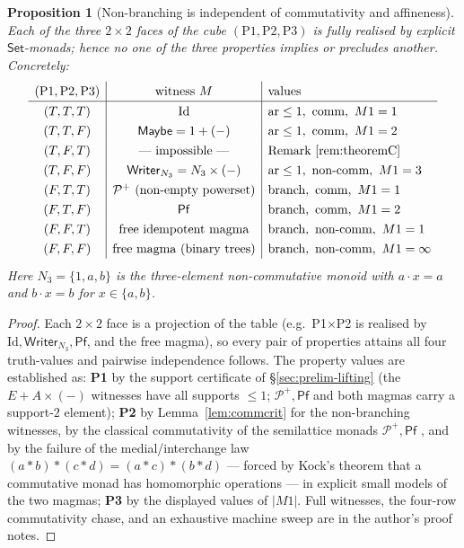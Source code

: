 \documentclass[11pt]{amsart}
\theoremstyle{plain}
\newtheorem{proposition}[theorem]{Proposition}
\theoremstyle{definition}
\theoremstyle{remark}
\newcommand{\Set}{\mathsf{Set}}
\newcommand{\Maybe}{\mathsf{Maybe}}
\newcommand{\Pf}{\mathsf{Pf}}
\newcommand{\Writer}{\mathsf{Writer}}
\begin{document}
\begin{proposition}[Non-branching is independent of commutativity and affineness]\label{prop:independence}
Each of the three $2\times2$ faces of the cube $(\mathrm{P1},\mathrm{P2},\mathrm{P3})$ is fully
realised by explicit $\Set$-monads; hence no one of the three properties implies or precludes
another. Concretely:
\[
  \renewcommand{\arraystretch}{1.3}
  \begin{array}{c|c|l}
    (\mathrm{P1},\mathrm{P2},\mathrm{P3}) & \text{witness } M & \text{values}\\\hline
    (T,T,T) & \mathrm{Id} & \text{ar}\le1,\ \text{comm},\ M1=1\\
    (T,T,F) & \Maybe=1+(-) & \text{ar}\le1,\ \text{comm},\ M1=2\\
    (T,F,T) & \text{--- impossible ---} & \text{Remark~\ref{rem:theoremC}}\\
    (T,F,F) & \Writer_{N_3}=N_3\times(-) & \text{ar}\le1,\ \text{non-comm},\ M1=3\\
    (F,T,T) & \mathcal P^{+}\ (\text{non-empty powerset}) & \text{branch},\ \text{comm},\ M1=1\\
    (F,T,F) & \Pf & \text{branch},\ \text{comm},\ M1=2\\
    (F,F,T) & \text{free idempotent magma} & \text{branch},\ \text{non-comm},\ M1=1\\
    (F,F,F) & \text{free magma (binary trees)} & \text{branch},\ \text{non-comm},\ M1=\infty
  \end{array}
\]
Here $N_3=\{1,a,b\}$ is the three-element non-commutative monoid with $a\cdot x=a$ and
$b\cdot x=b$ for $x\in\{a,b\}$.
\end{proposition}
\begin{proof}
Each $2\times2$ face is a projection of the table (e.g.\ P1$\times$P2 is realised by
$\mathrm{Id},\Writer_{N_3},\Pf$, and the free magma), so every pair of properties attains all
four truth-values and pairwise independence follows. The property values are established as:
\textbf{P1} by the support certificate of \S\ref{sec:prelim-lifting} (the $E+A\times(-)$
witnesses have all supports $\le1$; $\mathcal P^{+},\Pf$ and both magmas carry a support-$2$
element); \textbf{P2} by Lemma~\ref{lem:commcrit} for the non-branching witnesses, by the
classical commutativity of the semilattice monads $\mathcal P^{+},\Pf$ \cite{Kock71}, and by
the failure of the medial/interchange law $(a*b)*(c*d)=(a*c)*(b*d)$ --- forced by Kock's
theorem that a commutative monad has homomorphic operations --- in explicit small models of the
two magmas; \textbf{P3} by the displayed values of $|M1|$. Full witnesses, the four-row
commutativity chase, and an exhaustive machine sweep are in the author's proof notes.
\end{proof}
\end{document}
